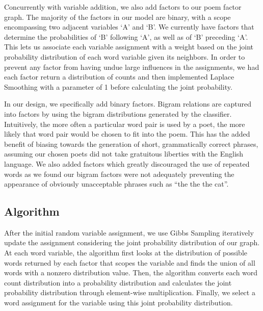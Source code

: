 \documentclass[journal]{IEEEtran}
\begin{document}
Concurrently with variable addition, we also add factors to our poem factor graph. The majority of the factors in our model are binary, with a scope encompassing two adjacent variables ‘A’ and ‘B’. We currently have factors that determine the probabilities of ‘B’ following  ‘A’, as well as of ‘B’ preceding ‘A’. This lets us associate each variable assignment with a weight based on the joint probability distribution of each word variable given its neighbors. In order to prevent any factor from having undue large influences in the assignments, we had each factor return a distribution of counts and then implemented Laplace Smoothing with a parameter of 1 before calculating the joint probability.

In our design, we specifically add binary factors. Bigram relations are captured into factors by using the bigram distributions generated by the classifier. Intuitively, the more often a particular word pair is used by a poet, the more likely that word pair would be chosen to fit into the poem. This has the added benefit of biasing towards the generation of short, grammatically correct phrases, assuming our chosen poets did not take gratuitous liberties with the English language. We also added factors which greatly discouraged the use of repeated words as we found our bigram factors were not adequately preventing the appearance of obviously unacceptable phrases such as “the the the cat”.

\subsection{Algorithm}
After the initial random variable assignment, we use Gibbs Sampling iteratively update the assignment considering the joint probability distribution of our graph. At each word variable, the algorithm first looks at the distribution of possible words returned by each factor that scopes the variable and finds the union of all words with a nonzero distribution value. Then, the algorithm converts each word count distribution into a probability distribution and calculates the joint probability distribution through element-wise multiplication. Finally, we select a word assignment for the variable using this joint probability distribution. 
\end{document}
